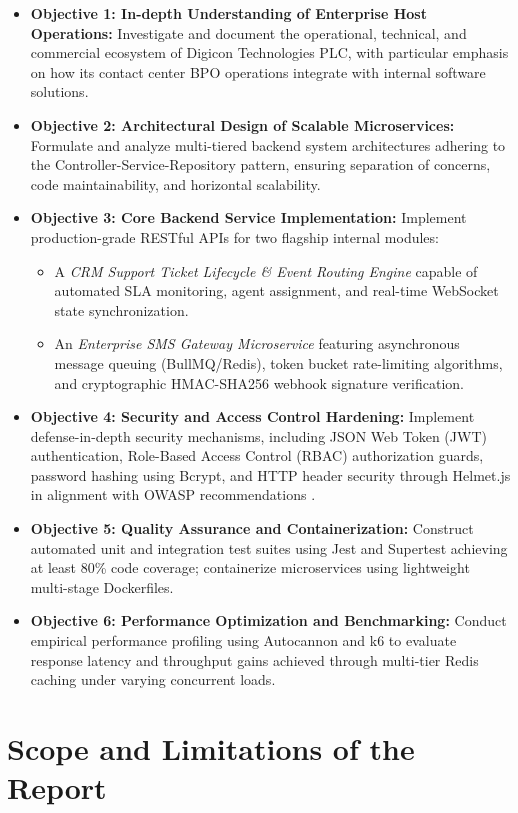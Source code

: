 \begin{itemize}
    \item \textbf{Objective 1: In-depth Understanding of Enterprise Host Operations:} Investigate and document the operational, technical, and commercial ecosystem of Digicon Technologies PLC, with particular emphasis on how its contact center BPO operations integrate with internal software solutions.
    \item \textbf{Objective 2: Architectural Design of Scalable Microservices:} Formulate and analyze multi-tiered backend system architectures adhering to the Controller-Service-Repository pattern, ensuring separation of concerns, code maintainability, and horizontal scalability.
    \item \textbf{Objective 3: Core Backend Service Implementation:} Implement production-grade RESTful APIs for two flagship internal modules:
    \begin{itemize}
        \item A \textit{CRM Support Ticket Lifecycle \& Event Routing Engine} capable of automated SLA monitoring, agent assignment, and real-time WebSocket state synchronization.
        \item An \textit{Enterprise SMS Gateway Microservice} featuring asynchronous message queuing (BullMQ/Redis), token bucket rate-limiting algorithms, and cryptographic HMAC-SHA256 webhook signature verification.
    \end{itemize}
    \item \textbf{Objective 4: Security and Access Control Hardening:} Implement defense-in-depth security mechanisms, including JSON Web Token (JWT) authentication, Role-Based Access Control (RBAC) authorization guards, password hashing using Bcrypt, and HTTP header security through Helmet.js in alignment with OWASP recommendations \citep{owasp2023top10}.
    \item \textbf{Objective 5: Quality Assurance and Containerization:} Construct automated unit and integration test suites using Jest and Supertest achieving at least 80\% code coverage; containerize microservices using lightweight multi-stage Dockerfiles.
    \item \textbf{Objective 6: Performance Optimization and Benchmarking:} Conduct empirical performance profiling using Autocannon and k6 to evaluate response latency and throughput gains achieved through multi-tier Redis caching under varying concurrent loads.
\end{itemize}

\section{Scope and Limitations of the Report}
\label{sec:intro_scope}

